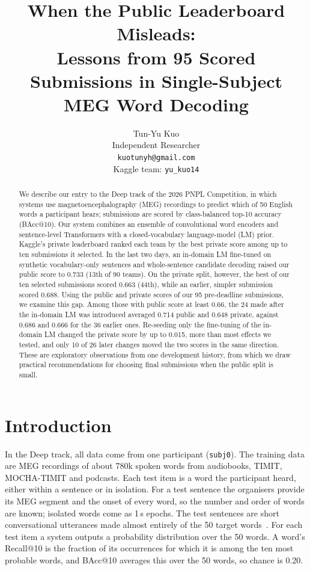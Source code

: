 \documentclass{article}
\title{When the Public Leaderboard Misleads:\\ Lessons from 95 Scored Submissions in Single-Subject MEG Word Decoding}
\author{%
  Tun-Yu Kuo \\
  Independent Researcher \\
  \texttt{kuotunyh@gmail.com} \\
  Kaggle team: \texttt{yu\_kuo14}
}
\begin{document}
\maketitle

\begin{abstract}
We describe our entry to the Deep track of the 2026 PNPL Competition, in which systems use magnetoencephalography (MEG) recordings to predict which of 50 English words a participant hears; submissions are scored by class-balanced top-10 accuracy (BAcc@10). Our system combines an ensemble of convolutional word encoders and sentence-level Transformers with a closed-vocabulary language-model (LM) prior. Kaggle's private leaderboard ranked each team by the best private score among up to ten submissions it selected. In the last two days, an in-domain LM fine-tuned on synthetic vocabulary-only sentences and whole-sentence candidate decoding raised our public score to 0.733 (13th of 90 teams). On the private split, however, the best of our ten selected submissions scored 0.663 (44th), while an earlier, simpler submission scored 0.688. Using the public and private scores of our 95 pre-deadline submissions, we examine this gap. Among those with public score at least 0.66, the 24 made after the in-domain LM was introduced averaged 0.714 public and 0.648 private, against 0.686 and 0.666 for the 36 earlier ones. Re-seeding only the fine-tuning of the in-domain LM changed the private score by up to 0.015, more than most effects we tested, and only 10 of 26 later changes moved the two scores in the same direction. These are exploratory observations from one development history, from which we draw practical recommendations for choosing final submissions when the public split is small.
\end{abstract}

\section{Introduction}

In the Deep track, all data come from one participant (\texttt{subj0}). The training data are MEG recordings of about 780k spoken words from audiobooks, TIMIT, MOCHA-TIMIT and podcasts. Each test item is a word the participant heard, either within a sentence or in isolation. For a test sentence the organisers provide its MEG segment and the onset of every word, so the number and order of words are known; isolated words come as 1\,s epochs. The test sentences are short conversational utterances made almost entirely of the 50 target words~\cite{pnpl2026}. For each test item a system outputs a probability distribution over the 50 words. A word's Recall@10 is the fraction of its occurrences for which it is among the ten most probable words, and BAcc@10 averages this over the 50 words, so chance is 0.20.
\end{document}
